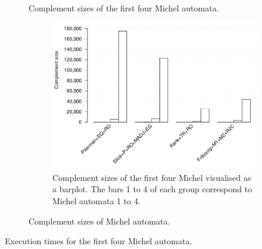 \begin{figure}[ht]
  \centering
  \begin{subtable}{0.75\textwidth}
    \centering
    
    \caption{Complement sizes of the first four Michel automata.}
  \end{subtable}

  \begin{subfigure}{0.75\textwidth}
    \centering
    \includegraphics[width=\textwidth]{figures/r/external/michel/s.barplot.pdf}
    \caption{Complement sizes of the first four Michel visualised as a barplot. The bars 1 to 4 of each group correspond to Michel automata 1 to 4.}
  \end{subfigure}
  \caption{Complement sizes of Michel automata.}
\end{figure}


\begin{table}[ht]
\centering

\caption{Execution times for the first four Michel automata.}
\end{table}
